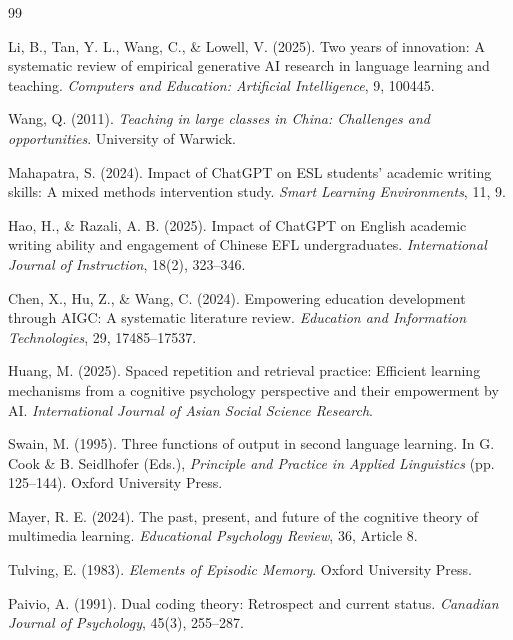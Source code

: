 \documentclass[12pt,a4paper]{ctexart}
\begin{document}
\begin{thebibliography}{99}

Li, B., Tan, Y. L., Wang, C., \& Lowell, V. (2025). Two years of innovation: A systematic review of empirical generative AI research in language learning and teaching. \textit{Computers and Education: Artificial Intelligence}, 9, 100445.

Wang, Q. (2011). \textit{Teaching in large classes in China: Challenges and opportunities}. University of Warwick.

Mahapatra, S. (2024). Impact of ChatGPT on ESL students' academic writing skills: A mixed methods intervention study. \textit{Smart Learning Environments}, 11, 9.

Hao, H., \& Razali, A. B. (2025). Impact of ChatGPT on English academic writing ability and engagement of Chinese EFL undergraduates. \textit{International Journal of Instruction}, 18(2), 323--346.

Chen, X., Hu, Z., \& Wang, C. (2024). Empowering education development through AIGC: A systematic literature review. \textit{Education and Information Technologies}, 29, 17485--17537.

Huang, M. (2025). Spaced repetition and retrieval practice: Efficient learning mechanisms from a cognitive psychology perspective and their empowerment by AI. \textit{International Journal of Asian Social Science Research}.

Swain, M. (1995). Three functions of output in second language learning. In G. Cook \& B. Seidlhofer (Eds.), \textit{Principle and Practice in Applied Linguistics} (pp. 125--144). Oxford University Press.

Mayer, R. E. (2024). The past, present, and future of the cognitive theory of multimedia learning. \textit{Educational Psychology Review}, 36, Article 8.

Tulving, E. (1983). \textit{Elements of Episodic Memory}. Oxford University Press.

Paivio, A. (1991). Dual coding theory: Retrospect and current status. \textit{Canadian Journal of Psychology}, 45(3), 255--287.


\end{thebibliography}
\end{document}
